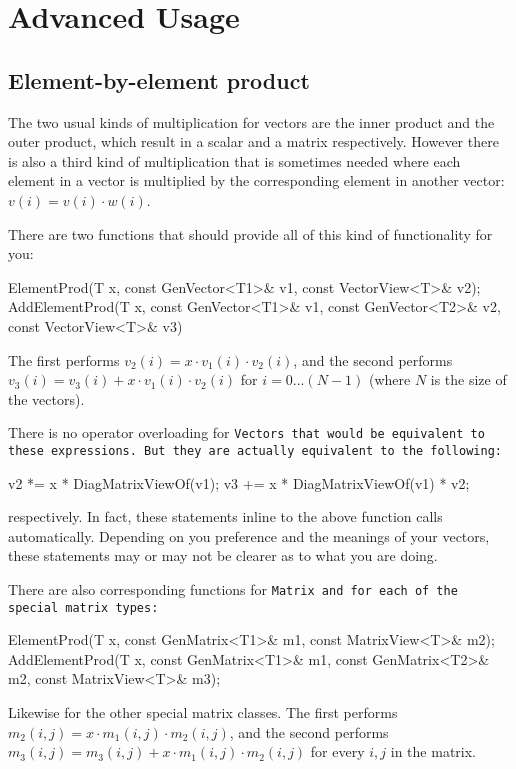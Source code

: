
\section{Advanced Usage}

\subsection{Element-by-element product}
\label{ElementProd}

The two usual kinds of multiplication for vectors are the inner product and 
the outer product, which result in a scalar and a matrix respectively.
However there is also a third kind of multiplication that is sometimes needed where
each element in a vector is multiplied by the
corresponding element in another vector: $v(i) = v(i) \cdot w(i)$.

There are two functions that should provide all of this kind of functionality
for you:
\begin{tmvcode}
ElementProd(T x, const GenVector<T1>& v1, const VectorView<T>& v2);
AddElementProd(T x, const GenVector<T1>& v1, const GenVector<T2>& v2,
      const VectorView<T>& v3)
\end{tmvcode}
The first performs $v_2(i) = x \cdot v_1(i) \cdot v_2(i)$, and the second performs
$v_3(i) = v_3(i) + x \cdot v_1(i) \cdot v_2(i)$ for $i = 0 ... (N-1)$ (where $N$ is the 
size of the vectors).

There is no operator overloading for \tt{Vector}s that would be equivalent to 
these expressions.
But they are actually equivalent to the following:
\begin{tmvcode}
v2 *= x * DiagMatrixViewOf(v1);
v3 += x * DiagMatrixViewOf(v1) * v2;
\end{tmvcode}
respectively.  In fact, these statements inline to the above function calls
automatically.  Depending on you preference and the meanings of your vectors,
these statements may or may not be clearer as to what you are doing.

There are also corresponding functions for \tt{Matrix} and for each of the special
matrix types:
\begin{tmvcode}
ElementProd(T x, const GenMatrix<T1>& m1, const MatrixView<T>& m2);
AddElementProd(T x, const GenMatrix<T1>& m1, const GenMatrix<T2>& m2,
      const MatrixView<T>& m3);
\end{tmvcode}
Likewise for the other special matrix classes.  The first performs 
$m_2(i,j) = x \cdot m_1(i,j) \cdot m_2(i,j)$, and the second performs
$m_3(i,j) = m_3(i,j) + x \cdot m_1(i,j) \cdot m_2(i,j)$ for every $i,j$ in the matrix.

